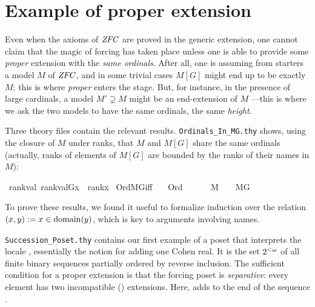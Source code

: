 \section{Example of proper extension}
\label{sec:example-proper-extension}

Even when the axioms of $\mathit{ZFC}$ are proved in the generic extension,
one cannot claim that the magic of forcing has taken place unless one
is able to provide some \emph{proper} extension with the \emph{same
ordinals}. After all, one is assuming from starters a model $M$ of $\mathit{ZFC}$,
and in some trivial cases $M[G]$ might end up to be exactly $M$; this
is where \emph{proper} enters the stage. But, for instance, in the
presence of large cardinals, a model $M'\supsetneq M$ might be an
end-extension of $M$ ---this is where we ask the two models to have the
same ordinals, the same \emph{height}. 

Three theory files contain the relevant
results. \verb|Ordinals_In_MG.thy| shows, using the closure of $M$
under ranks, that $M$ and $M[G]$ share the same ordinals (actually,
ranks of elements of $M[G]$ are bounded by the ranks of their names in
$M$):
\begin{isabelle}
\isamarkupfalse%
\ rank{\isacharunderscore}val{\isacharcolon}\ {\isachardoublequoteopen}rank{\isacharparenleft}val{\isacharparenleft}G{\isacharcomma}x{\isacharparenright}{\isacharparenright}\ {\isasymle}\ rank{\isacharparenleft}x{\isacharparenright}{\isachardoublequoteclose}\isanewline
{}\isamarkupfalse%
\ Ord{\isacharunderscore}MG{\isacharunderscore}iff{\isacharcolon}\isanewline
\ \ \ {\isachardoublequoteopen}Ord{\isacharparenleft}{\isasymalpha}{\isacharparenright}{\isachardoublequoteclose}\ \isanewline
\ \ \ {\isachardoublequoteopen}{\isasymalpha}\ {\isasymin}\ M\ {\isasymlongleftrightarrow}\ {\isasymalpha}\ {\isasymin}\ M{\isacharbrackleft}G{\isacharbrackright}{\isachardoublequoteclose}
\end{isabelle}
To prove these results, we found it useful to formalize induction over
the relation $(x,y) \mathrel{\mathop:}= x\in\operatorname{domain}(y)$, which is key
to arguments involving names.

\verb|Succession_Poset.thy| contains our first example of a poset
that interprets the locale
, essentially the notion for
adding one Cohen real. It is the set $2^{<\omega}$ of all finite binary
sequences partially  ordered by reverse inclusion.
The sufficient condition for a proper extension is that
the forcing poset is \emph{separative}: every element has two
incompatible () extensions. Here,
adds  to the end of the sequence .

